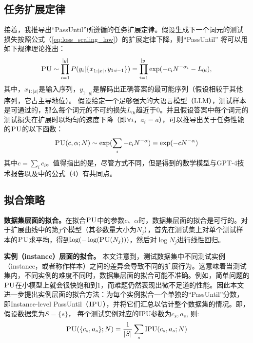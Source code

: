 \subsection{任务扩展定律}
接着，我推导出“PassUntil”所遵循的任务扩展定律。假设生成下一个词元的测试损失按照公式（\ref{eq:loss_scaling_law}）的扩展定律下降，则“PassUntil” 将可以用如下规律理论推出：
\begin{equation}
\label{eq:task_scaling_raw}
    \textsc{PU} \sim \prod_{i=1}^{|y|} P(y_i|\{x_{1:|x|}, y_{1:i - 1}\}) = \prod_{i=1}^{|y|} \exp(-{c_i}{{N}^{-\alpha_i}} - L_{0i}),
\end{equation}
其中，$x_{1:|x|}$是输入序列，$y_{1:|y|}$是解码出正确答案的最可能序列（假设相较于其他序列，它占主导地位）。
假设给定一个足够强大的大语言模型（LLM），测试样本是可通过的，那么每个词元的不可约损失$L_{0i}$趋近于$0$。并且假设答案中每个词元的测试损失在扩展时以均匀的速度下降（即$\forall i$，$a_i = a$），可以推导出关于任务性能的$\textsc{PU}$的以下函数：
\begin{equation}
\label{eq:exp_scaling}
    \textsc{PU}(c, \alpha; N) \sim \operatorname{exp}(\sum_i -{c_i}{{N}^{-\alpha}} ) = \operatorname{exp}(-{c}{{N}^{-\alpha}})
\end{equation}
其中$c = \sum_i c_i$。值得指出的是，尽管方式不同，但是得到的数学模型与GPT-4技术报告\citep{openai2023gpt4}以及\citet{schaeffer2023emergent}中的公式（4）有共同点。

\subsection{拟合策略}
\textbf{数据集层面的拟合。}在拟合$\textsc{PU}$中的参数$c$、$\alpha$时，数据集层面的拟合是可行的。对于扩展曲线中的第$j$个模型（其参数量大小为$N_j$），首先在测试集上对单个测试样本的$\textsc{PU}$求平均，得到$\operatorname{log}(-\operatorname{log}(\textsc{PU}(N_j)))$，然后对$\operatorname{log}N_j$进行线性回归。

\textbf{实例（instance）层面的拟合。}
\label{sec:instance_level_pass}
本文注意到，测试数据集中不同测试实例（instance，或者称作样本）之间的差异会导致不同的扩展行为。这意味着当测试集内，不同实例的难度不同时，数据集层面的拟合可能不准确。例如，简单问题的$\textsc{PU}$在小模型上就会很快饱和到$1$，而难题仍然表现出微不足道的性能。因此本文进一步提出实例层面的拟合方法：为每个实例拟合一个单独的“PassUntil”分数， 即Instance-level PassUntil（$\textsc{IPU}$），并将它们汇总以估计整个数据集的情况。即，假设数据集为$S = \{s\}$， 每个测试实例对应的IPU参数为$c_s, a_s$, 则:
\begin{equation}
    {\textsc{PU}}(\{c_s, a_s\}; N) = \frac{1}{|S|}\sum_s {\operatorname{IPU}}(c_s, a_s; N)
\end{equation}


